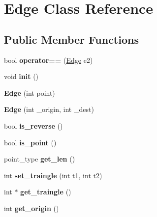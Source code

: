 \hypertarget{class_edge}{}\section{Edge Class Reference}
\label{class_edge}
\subsection*{Public Member Functions}
\begin{DoxyCompactItemize}
\item 
\mbox{\label{class_edge_a622bb692aeb34120868983fc3b3c0769}} 
bool {\bfseries operator==} (\mbox{\hyperlink{class_edge}{Edge}} e2)
\item 
\mbox{\label{class_edge_ad7a4b4fe66c396c7115ec20a443cdb69}} 
void {\bfseries init} ()
\item 
\mbox{\label{class_edge_abcf2ba0a2bac16c837f1dcd63d2e51a4}} 
{\bfseries Edge} (int point)
\item 
\mbox{\label{class_edge_a3088340b661c638ccb81294ec037f84d}} 
{\bfseries Edge} (int \+\_\+origin, int \+\_\+dest)
\item 
\mbox{\label{class_edge_a5c08a0b91b69287b359aa21b66bd0af7}} 
bool {\bfseries is\+\_\+reverse} ()
\item 
\mbox{\label{class_edge_ac5643518fc59fd5a7f5343496ce3e9de}} 
bool {\bfseries is\+\_\+point} ()
\item 
\mbox{\label{class_edge_aeb62a1611cc77e54d4a9c94c2491dcd9}} 
point\+\_\+type {\bfseries get\+\_\+len} ()
\item 
\mbox{\label{class_edge_a519a44188a63778b0e814e7a328f657e}} 
int {\bfseries set\+\_\+traingle} (int t1, int t2)
\item 
\mbox{\label{class_edge_ad60b5f00b7a9338c7f1af374f5a83de4}} 
int $\ast$ {\bfseries get\+\_\+traingle} ()
\item 
\mbox{\label{class_edge_ae8cde91bf6e9d1f0833c1d8b9008f42b}} 
int {\bfseries get\+\_\+origin} ()
\item 

\end{DoxyCompactItemize}
